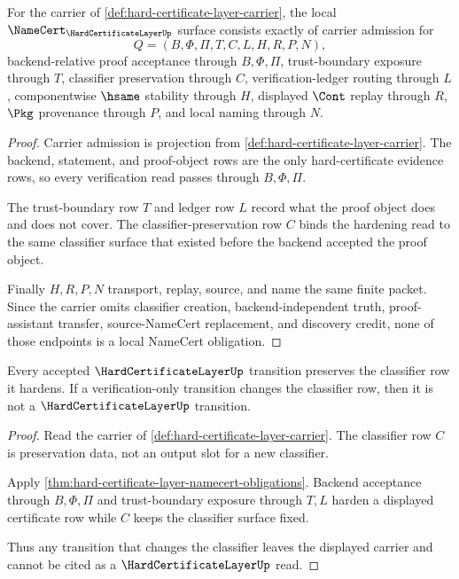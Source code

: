\begin{theorem}
\label{thm:hard-certificate-layer-namecert-obligations}
For the carrier of \autoref{def:hard-certificate-layer-carrier}, the local $\NameCert_{\HardCertificateLayerUp}$ surface consists exactly of carrier admission for
$$
Q=(B,\Phi,\Pi,T,C,L,H,R,P,N),
$$
backend-relative proof acceptance through $B,\Phi,\Pi$, trust-boundary exposure through $T$, classifier preservation through $C$, verification-ledger routing through $L$, componentwise $\hsame$ stability through $H$, displayed $\Cont$ replay through $R$, $\Pkg$ provenance through $P$, and local naming through $N$.
\end{theorem}
\begin{proof}
Carrier admission is projection from \autoref{def:hard-certificate-layer-carrier}. The backend, statement, and proof-object rows are the only hard-certificate evidence rows, so every verification read passes through $B,\Phi,\Pi$.

The trust-boundary row $T$ and ledger row $L$ record what the proof object does and does not cover. The classifier-preservation row $C$ binds the hardening read to the same classifier surface that existed before the backend accepted the proof object.

Finally $H,R,P,N$ transport, replay, source, and name the same finite packet. Since the carrier omits classifier creation, backend-independent truth, proof-assistant transfer, source-NameCert replacement, and discovery credit, none of those endpoints is a local NameCert obligation.
\end{proof}

\begin{theorem}
\label{thm:hard-certificate-layer-classifier-preservation}
Every accepted $\HardCertificateLayerUp$ transition preserves the classifier row it hardens. If a verification-only transition changes the classifier row, then it is not a $\HardCertificateLayerUp$ transition.
\end{theorem}
\begin{proof}
Read the carrier of \autoref{def:hard-certificate-layer-carrier}. The classifier row $C$ is preservation data, not an output slot for a new classifier.

Apply \autoref{thm:hard-certificate-layer-namecert-obligations}. Backend acceptance through $B,\Phi,\Pi$ and trust-boundary exposure through $T,L$ harden a displayed certificate row while $C$ keeps the classifier surface fixed.

Thus any transition that changes the classifier leaves the displayed carrier and cannot be cited as a $\HardCertificateLayerUp$ read.
\end{proof}

